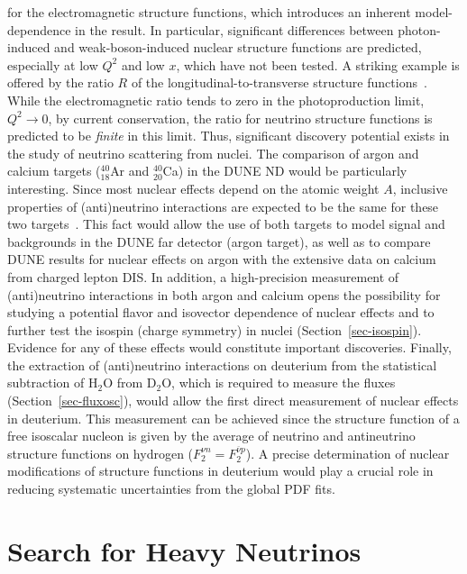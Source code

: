 for the electromagnetic structure functions, which introduces an
inherent model-dependence in the result.  In particular, significant
differences between photon-induced and weak-boson-induced nuclear
structure functions are predicted, especially at low $Q^2$ and low
$x$, which have not been tested.  A striking example is offered by the
ratio $R$ of the longitudinal-to-transverse structure
functions~\cite{Kulagin:2007ju}.  While the electromagnetic ratio tends
to zero in the photoproduction limit, $Q^2 \to 0$, by current
conservation, the ratio for neutrino structure functions is predicted
to be \emph{finite} in this limit.  Thus, significant discovery
potential exists in the study of neutrino scattering from nuclei.
The comparison of argon and calcium targets (${}^{40}_{18}$Ar and
${}^{40}_{20}$Ca) in the DUNE ND would be particularly
interesting. Since most nuclear effects depend on the atomic weight
$A$, inclusive properties of (anti)neutrino interactions are expected
to be the same for these two
targets~\cite{Kulagin:2007ju,Butkevich:2012zr,Butkevich:2007gm,Ankowski:2007uy}.
This fact would allow the use of both targets to model signal and
backgrounds in the DUNE far detector (argon target), as well as to
compare DUNE results for nuclear effects on argon with the extensive
data on calcium from charged lepton DIS. In addition, a high-precision
measurement of (anti)neutrino interactions in both argon and calcium
opens the possibility for studying a potential flavor and isovector
dependence of nuclear effects and to further test the isospin (charge
symmetry) in nuclei (Section~\ref{sec-isospin}).  Evidence for any
of these effects would constitute important discoveries.
Finally, the extraction of (anti)neutrino interactions on deuterium
from the statistical subtraction of H$_2$O from D$_2$O, which is
required to measure the fluxes (Section~\ref{sec-fluxosc}), would
allow the first direct measurement of nuclear effects in deuterium.
This measurement can be achieved since the structure function of a
free isoscalar nucleon is given by the average of neutrino and
antineutrino structure functions on hydrogen ($F_2^{\nu
  n}=F_2^{\overline{\nu} p}$).  A precise determination of nuclear
modifications of structure functions in deuterium would play a crucial
role in reducing systematic uncertainties from the global PDF fits.
\section{Search for Heavy Neutrinos} 

